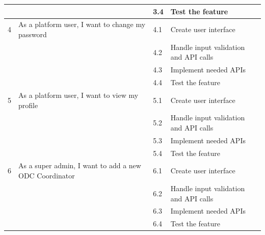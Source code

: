 \begin{longtable}{|p{1cm}|p{7cm}|p{1cm}|p{7cm}|}
                                    &                                                               & 3.4         & Test the feature                      \\ \hline
    4                               & As a platform user, I want to change my password              & 4.1         & Create user interface                 \\ \cline{3-4}
                                    &                                                               & 4.2         & Handle input validation and API calls \\ \cline{3-4}
                                    &                                                               & 4.3         & Implement needed APIs                 \\ \cline{3-4}
                                    &                                                               & 4.4         & Test the feature                      \\ \hline
    5                               & As a platform user, I want to view my profile                 & 5.1         & Create user interface                 \\ \cline{3-4}
                                    &                                                               & 5.2         & Handle input validation and API calls \\ \cline{3-4}
                                    &                                                               & 5.3         & Implement needed APIs                 \\ \cline{3-4}
                                    &                                                               & 5.4         & Test the feature                      \\ \hline
    6                               & As a super admin, I want to add a new ODC Coordinator         & 6.1         & Create user interface                 \\ \cline{3-4}
                                    &                                                               & 6.2         & Handle input validation and API calls \\ \cline{3-4}
                                    &                                                               & 6.3         & Implement needed APIs                 \\ \cline{3-4}
                                    &                                                               & 6.4         & Test the feature                      \\ \hline

\end{longtable}
